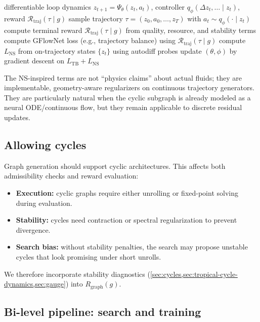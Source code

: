 \documentclass[11pt]{article}
\theoremstyle{definition}
\theoremstyle{plain}
\theoremstyle{remark}
\newcommand{\mc}[1]{\mathcal{#1}}
\newcommand{\Reward}{\mc{R}}
\begin{document}
\begin{algorithm}[t]
\caption{Fluid-regularized continuous GFlowNet fine-tuning for embedding-native reasoning loops}
\label{alg:fluid-gfn}
\begin{algorithmic}[1]
\Require differentiable loop dynamics $z_{t+1}=\Psi_\theta(z_t,a_t)$, controller $q_\phi(\Delta z_t,\ldots\mid z_t)$, reward $\Reward_{\mathrm{traj}}(\tau\mid g)$
  \State sample trajectory $\tau=(z_0,a_0,\ldots,z_T)$ with $a_t\sim q_\phi(\cdot\mid z_t)$
  \State compute terminal reward $\Reward_{\mathrm{traj}}(\tau\mid g)$ from quality, resource, and stability terms
  \State compute GFlowNet loss (e.g., trajectory balance) using $\Reward_{\mathrm{traj}}(\tau\mid g)$
  \State compute $L_{\mathrm{NS}}$ from on-trajectory states $\{z_t\}$ using autodiff probes
  \State update $(\theta,\phi)$ by gradient descent on $L_{\mathrm{TB}} + L_{\mathrm{NS}}$
\EndFor
\end{algorithmic}
\end{algorithm}

The NS-inspired terms are not ``physics claims'' about actual fluids; they are implementable, geometry-aware regularizers on continuous trajectory generators.
They are particularly natural when the cyclic subgraph is already modeled as a neural ODE/continuous flow, but they remain applicable to discrete residual updates.

\subsection{Allowing cycles}
Graph generation should support cyclic architectures.
This affects both admissibility checks and reward evaluation:
\begin{itemize}[leftmargin=2em]
\item \textbf{Execution:} cyclic graphs require either unrolling or fixed-point solving during evaluation.
\item \textbf{Stability:} cycles need contraction or spectral regularization to prevent divergence.
\item \textbf{Search bias:} without stability penalties, the search may propose unstable cycles that look promising under short unrolls.
\end{itemize}
We therefore incorporate stability diagnostics (\cref{sec:cycles,sec:tropical-cycle-dynamics,sec:gauge}) into $R_{\mathrm{graph}}(g)$.

\subsection{Bi-level pipeline: search and training}
\label{sec:bilevel}
\end{document}
